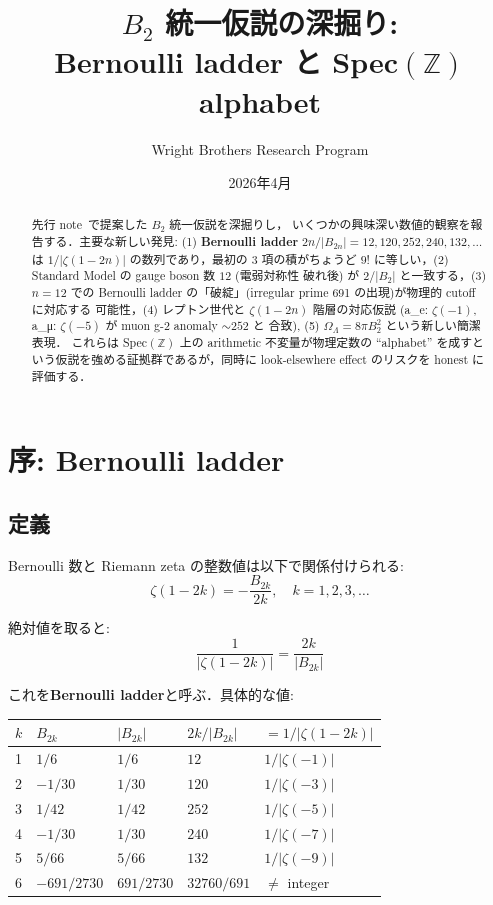 \documentclass[11pt,a4paper]{article}
\title{$B_2$ 統一仮説の深掘り:\\
Bernoulli ladder と Spec$(\mathbb{Z})$ alphabet}
\author{Wright Brothers Research Program}
\date{2026年4月}
\begin{document}
\maketitle

\begin{abstract}
先行 note~\cite{b2-note}で提案した $B_2$ 統一仮説を深掘りし，
いくつかの興味深い数値的観察を報告する．主要な新しい発見:
(1) \textbf{Bernoulli ladder} $2n/|B_{2n}| = 12, 120, 252, 240, 132, \ldots$
は $1/|\zeta(1-2n)|$ の数列であり，最初の 3 項の積がちょうど $9!$
に等しい，(2) Standard Model の gauge boson 数 $12$ (電弱対称性
破れ後) が $2/|B_2|$ と一致する，(3) $n = 12$ での Bernoulli ladder
の「破綻」(irregular prime 691 の出現)が物理的 cutoff に対応する
可能性，(4) レプトン世代と $\zeta(1-2n)$ 階層の対応仮説
(a_e: $\zeta(-1)$, a_μ: $\zeta(-5)$ が muon g-2 anomaly $\sim 252$ と
合致),  (5) $\Omega_\Lambda = 8\pi B_2^2$ という新しい簡潔表現．
これらは Spec$(\mathbb{Z})$ 上の arithmetic 不変量が物理定数の
``alphabet'' を成すという仮説を強める証拠群であるが，同時に
look-elsewhere effect のリスクを honest に評価する．
\end{abstract}

\tableofcontents

\section{序: Bernoulli ladder}

\subsection{定義}

Bernoulli 数と Riemann zeta の整数値は以下で関係付けられる:
\begin{equation}
\zeta(1 - 2k) = -\frac{B_{2k}}{2k}, \quad k = 1, 2, 3, \ldots
\end{equation}

絶対値を取ると:
\begin{equation}
\frac{1}{|\zeta(1 - 2k)|} = \frac{2k}{|B_{2k}|}
\end{equation}

これを\textbf{Bernoulli ladder}と呼ぶ．具体的な値:

\begin{center}
\begin{tabular}{lllll}
\toprule
$k$ & $B_{2k}$ & $|B_{2k}|$ & $2k/|B_{2k}|$ & $= 1/|\zeta(1-2k)|$ \\
\midrule
1 & $1/6$ & $1/6$ & $12$ & $1/|\zeta(-1)|$\\
2 & $-1/30$ & $1/30$ & $120$ & $1/|\zeta(-3)|$\\
3 & $1/42$ & $1/42$ & $252$ & $1/|\zeta(-5)|$\\
4 & $-1/30$ & $1/30$ & $240$ & $1/|\zeta(-7)|$\\
5 & $5/66$ & $5/66$ & $132$ & $1/|\zeta(-9)|$\\
6 & $-691/2730$ & $691/2730$ & $32760/691$ & $\neq$ integer\\
\bottomrule
\end{tabular}
\end{center}
\end{document}
